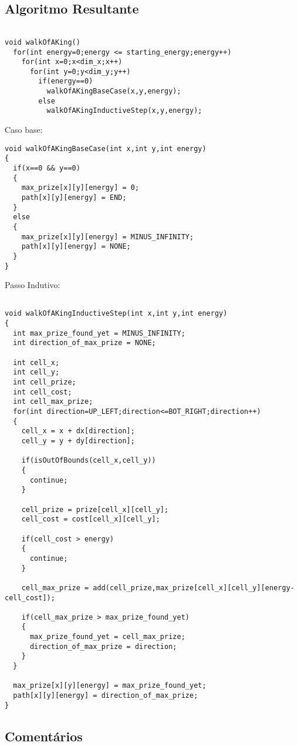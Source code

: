 \documentclass[12pt]{article}
\begin{document}
\subsection{ Algoritmo Resultante }

\begin{lstlisting}

void walkOfAKing()
  for(int energy=0;energy <= starting_energy;energy++)
    for(int x=0;x<dim_x;x++)
      for(int y=0;y<dim_y;y++)
        if(energy==0)
          walkOfAKingBaseCase(x,y,energy);
        else
          walkOfAKingInductiveStep(x,y,energy);
\end{lstlisting}
Caso base:
\begin{lstlisting}
void walkOfAKingBaseCase(int x,int y,int energy)
{
  if(x==0 && y==0)
  {
    max_prize[x][y][energy] = 0;
    path[x][y][energy] = END;
  }
  else
  {
    max_prize[x][y][energy] = MINUS_INFINITY;
    path[x][y][energy] = NONE;  
  } 
}
\end{lstlisting}
Passo Indutivo:
\begin{lstlisting}

void walkOfAKingInductiveStep(int x,int y,int energy)
{
  int max_prize_found_yet = MINUS_INFINITY;
  int direction_of_max_prize = NONE;

  int cell_x;
  int cell_y;
  int cell_prize;
  int cell_cost;
  int cell_max_prize;
  for(int direction=UP_LEFT;direction<=BOT_RIGHT;direction++)
  {
    cell_x = x + dx[direction];
    cell_y = y + dy[direction];

    if(isOutOfBounds(cell_x,cell_y))
    {
      continue;
    }

    cell_prize = prize[cell_x][cell_y];
    cell_cost = cost[cell_x][cell_y];

    if(cell_cost > energy)
    {
      continue;
    }

    cell_max_prize = add(cell_prize,max_prize[cell_x][cell_y][energy-cell_cost]);

    if(cell_max_prize > max_prize_found_yet)
    {
      max_prize_found_yet = cell_max_prize;
      direction_of_max_prize = direction;
    }
  }

  max_prize[x][y][energy] = max_prize_found_yet;
  path[x][y][energy] = direction_of_max_prize;
}
\end{lstlisting}



\subsection{ Comentários }
\end{document}
